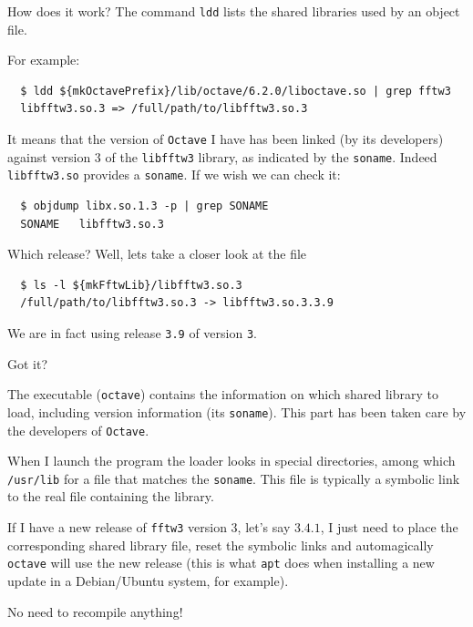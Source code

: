 \documentclass[12pt,aspectratio=169]{beamer}
\begin{document}
  
  \begin{frame}[fragile]{How does it work?}  The command
    \texttt{ldd} lists the shared libraries used by an object file.
  
  For example:
  \begin{verbatim}
  $ ldd ${mkOctavePrefix}/lib/octave/6.2.0/liboctave.so | grep fftw3
  libfftw3.so.3 => /full/path/to/libfftw3.so.3
  \end{verbatim}
  It means that the version of \texttt{Octave} I have has been linked (by its
  developers) against version $3$ of the \texttt{libfftw3} library, 
  as indicated by the \texttt{soname}.   Indeed \texttt{libfftw3.so} provides a \texttt{soname}. If we wish we
  can check it:
  \begin{verbatim}
  $ objdump libx.so.1.3 -p | grep SONAME
  SONAME   libfftw3.so.3
  \end{verbatim}
  
  Which release? Well, lets take a closer look at the file
  \begin{verbatim}
  $ ls -l ${mkFftwLib}/libfftw3.so.3
  /full/path/to/libfftw3.so.3 -> libfftw3.so.3.3.9
  \end{verbatim}
  We are in fact using release \texttt{3.9} of version \texttt{3}.
  \end{frame}
  
  \begin{frame}{Got it?}  
  
    The executable (\texttt{octave}) contains the
    information on which shared library to load, including version
    information (its \texttt{soname}). This part has been taken care by the 
    developers of \texttt{Octave}.
    \smallskip
  
    When I launch the program the loader looks in special directories,
    among which \texttt{/usr/lib} for a file that matches the
    \texttt{soname}. This file is typically a symbolic link to the real
    file containing the library.  
    \medskip
  
    If I have a new release of \texttt{fftw3} version 3, let's say $3.4.1$,
    I just need to place the corresponding shared library file, reset the symbolic links and automagically \texttt{octave}
    will use the new release (this is what \texttt{apt} does when
    installing a new update in a Debian/Ubuntu system, for example).
  
    \smallskip
  
    No need to recompile anything!
  \end{frame}
  
\end{document}
